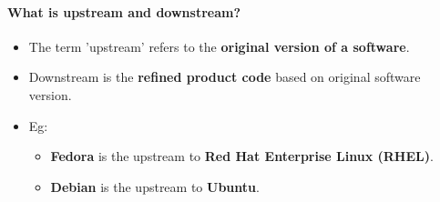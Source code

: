 \begin{flushleft}
\begin{itemize}
	\end{itemize}

	\newpage
	\paragraph{What is upstream and downstream?}
	\begin{itemize}
		\item The term 'upstream' refers to the \textbf{original version of a software}.
		\item Downstream is the \textbf{refined product code} based on original software version.
		\item Eg:
		\begin{itemize}
			\item \textbf{Fedora} is the upstream to \textbf{Red Hat Enterprise Linux (RHEL)}.
			\item \textbf{Debian} is the upstream to \textbf{Ubuntu}.
		\end{itemize}
	\end{itemize}
\end{flushleft}
\newpage
